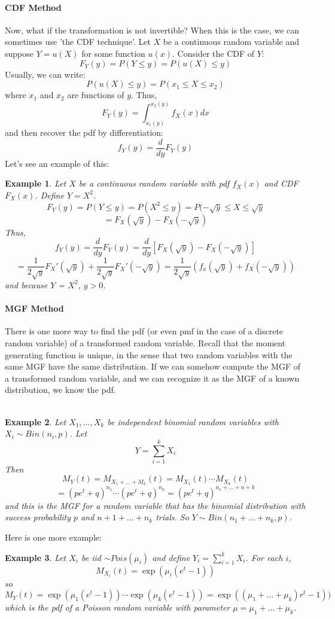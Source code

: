 \documentclass[12pt]{article} %
\newtheorem{example}{Example}
\begin{document}
\paragraph{CDF Method}
Now, what if the transformation is not invertible? When this is the case, we can sometimes use 'the CDF technique'. Let $X$ be a continuous random variable and suppose $Y=u(X)$ for some function $u(x)$. Consider the CDF of $Y$:
$$F_Y(y) = P(Y\leq y) = P(u(X)\leq y)$$
Usually, we can write:
$$P(u(X)\leq y) = P(x_1 \leq X \leq x_2)$$
where $x_1$ and $x_2$ are functions of $y$. Thus,
$$F_Y(y) = \int_{x_1(y)}^{x_2(y)} f_X(x) dx$$
and then recover the pdf by differentiation:
$$f_Y(y) = \frac{d}{dy} F_Y(y)$$
Let's see an example of this:\\
\begin{example}
Let $X$ be a continuous random variable with pdf $f_X(x)$ and CDF $F_X(x)$. Define $Y=X^2$.
$$F_Y(y) = P(Y\leq y) = P(X^2\leq y) = P(-\sqrt{y} \leq X\leq \sqrt{y}$$
$$= F_X(\sqrt{y}) - F_X(-\sqrt{y})$$
Thus,
$$f_Y(y) = \frac{d}{dy} F_Y(y) = \frac{d}{dy}\left[F_X(\sqrt{y})-F_X(-\sqrt{y})\right]$$
$$= \frac1{2\sqrt{y}}F_X'(\sqrt{y}) + \frac1{2\sqrt{y}}F_X'(-\sqrt{y}) =  \frac1{2\sqrt{y}}\left(f_x(\sqrt{y})+f_X(-\sqrt{y})\right)$$
and because $Y$ = $X^2$, $y>0$.
\end{example}
\paragraph{MGF Method}
There is one more way to find the pdf (or even pmf in the case of a discrete random variable) of a transformed random variable. Recall that the moment generating function is unique, in the sense that two random variables with the same MGF have the same distribution. If we can somehow compute the MGF of a transformed random variable, and we can recognize it as the MGF of a known distribution, we know the pdf.\\\\
\begin{example}
Let $X_1,...,X_k$ be independent binomial random variables with $X_i\sim Bin(n_i,p)$. Let
$$Y=\sum_{i=1}^k X_i$$
Then
$$M_Y(t) = M_{X_1+...+M_k}(t) = M_{X_1}(t)\cdots M_{X_k}(t)$$
$$ = \left(pe^t + q\right)^{n_1}\cdots\left(pe^t+q\right)^{n_k} = \left(pe^t + q\right)^{n_1+...+n+k} $$
and this is the MGF for a random variable that has the binomial distribution with success probability $p$ and $n+1+...+n_k$ trials. So $Y\sim Bin(n_1+...+n_k,p)$.
\end{example}
Here is one more example:
\begin{example}
Let $X_i$ be iid $\sim Pois(\mu_i)$ and define $Y_i=\sum_{i=1}^k X_i$.
For each $i$,
$$M_{X_i}(t) = \exp(\mu_i(e^t-1))$$
so 
$$M_Y(t) = \exp(\mu_1(e^t-1))\cdots\exp(\mu_k(e^t-1))= \exp((\mu_1+...+\mu_k)r^t-1))$$
which is the pdf of a Poisson random variable with parameter $\mu = \mu_1+...+\mu_k$.
\end{example}
\end{document}
